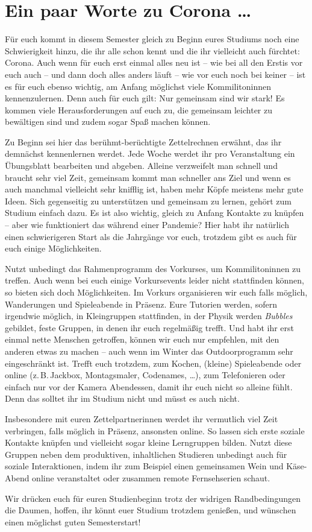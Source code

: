 \section{Ein paar Worte zu Corona \ldots}

Für euch kommt in diesem Semester gleich zu Beginn eures Studiums noch eine Schwierigkeit hinzu, die ihr alle schon kennt und die ihr vielleicht auch fürchtet: Corona.
Auch wenn für euch erst einmal alles neu ist -- wie bei all den Erstis vor euch auch -- und dann doch alles anders läuft -- wie vor euch noch bei keiner -- ist es für euch ebenso wichtig, am Anfang möglichst viele Kommilitoninnen kennenzulernen. Denn auch für euch gilt: Nur gemeinsam sind wir stark! Es kommen viele Herausforderungen auf euch zu, die gemeinsam leichter zu bewältigen sind und zudem sogar Spaß machen können.

Zu Beginn sei hier das berühmt-berüchtigte Zettelrechnen erwähnt, das ihr demnächst kennenlernen werdet. Jede Woche werdet ihr pro Veranstaltung ein Übungsblatt bearbeiten und abgeben. Alleine verzweifelt man schnell und braucht sehr viel Zeit, gemeinsam kommt man schneller ans Ziel und wenn es auch manchmal vielleicht sehr knifflig ist, haben mehr Köpfe meistens mehr gute Ideen. Sich gegenseitig zu unterstützen und gemeinsam zu lernen, gehört zum Studium einfach dazu. Es ist also wichtig, gleich zu Anfang Kontakte zu knüpfen -- aber wie funktioniert das während einer Pandemie? Hier habt ihr natürlich einen schwierigeren Start als die Jahrgänge vor euch, trotzdem gibt es auch für euch einige Möglichkeiten.

Nutzt unbedingt das Rahmenprogramm des Vorkurses, um Kommilitoninnen zu treffen. Auch wenn bei euch einige Vorkursevents leider nicht stattfinden können, so bieten sich doch Möglichkeiten. Im Vorkurs organisieren wir euch falls möglich, Wanderungen und Spieleabende in Präsenz.
Eure Tutorien werden, sofern irgendwie möglich, in Kleingruppen stattfinden, in der Physik werden \emph{Bubbles} gebildet, feste Gruppen, in denen ihr euch regelmäßig trefft.
Und habt ihr erst einmal nette Menschen getroffen, können wir euch nur empfehlen, mit den anderen etwas zu machen -- auch wenn im Winter das Outdoorprogramm sehr eingeschränkt ist. Trefft euch trotzdem, zum Kochen, (kleine) Spieleabende oder online (z.\,B.\,Jackbox, Montagsmaler, Codenames, \ldots), zum Telefonieren oder einfach nur vor der Kamera Abendessen, damit ihr euch nicht so alleine fühlt. Denn das solltet ihr im Studium nicht und müsst es auch nicht.

Insbesondere mit euren Zettelpartnerinnen werdet ihr vermutlich viel Zeit verbringen, falls möglich in Präsenz, ansonsten online. So lassen sich erste soziale Kontakte knüpfen und vielleicht sogar kleine Lerngruppen bilden. Nutzt diese Gruppen neben dem produktiven, inhaltlichen Studieren unbedingt auch für soziale Interaktionen, indem ihr zum Beispiel einen gemeinsamen Wein und Käse-Abend online veranstaltet oder zusammen remote Fernsehserien schaut.

Wir drücken euch für euren Studienbeginn trotz der widrigen Randbedingungen die Daumen, hoffen, ihr könnt euer Studium trotzdem genießen, und wünschen einen möglichst guten Semesterstart!